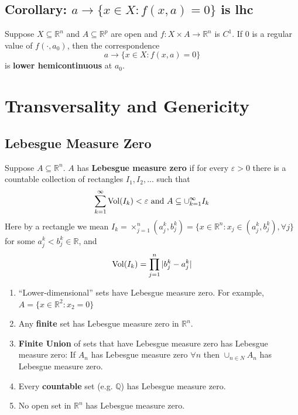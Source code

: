 \documentclass[11pt]{elegantbook}
\begin{document}
\subsection{Corollary: $a \rightarrow \{x\in X: f(x,a)=0\}$ is lhc}
\begin{corollary}
    Suppose $X \subseteq \mathbb{R}^n$ and $A \subseteq \mathbb{R}^p$ are open and $f : X \times A \rightarrow \mathbb{R}^n$ is $C^1$. If $0$ is a regular value of $f(\cdot, a_0)$, then the correspondence $$a \rightarrow \{x\in X: f(x,a)=0\}$$
    is \textbf{lower hemicontinuous} at $a_0$.
\end{corollary}


\section{Transversality and Genericity}
\subsection{Lebesgue Measure Zero}
\begin{definition}
    \normalfont
    Suppose $A \subseteq \mathbb{R}^n$. $A$ has \textbf{Lebesgue measure zero} if for every $\varepsilon > 0$ there is a countable collection of rectangles $I_1, I_2, . . .$ such that
    \begin{equation}
        \begin{aligned}
            \sum_{k=1}^\infty\textnormal{Vol}(I_k)<\varepsilon \textnormal{ and }A\subseteq \cup_{k=1}^\infty I_k
        \end{aligned}
        \nonumber
    \end{equation}
    Here by a rectangle we mean $I_k = \times^n_{j=1}(a^k_j , b^k_j)=\{x\in \mathbb{R}^n: x_j\in (a^k_j , b^k_j), \forall j\}$ for some $a^k_j < b^k_j \in \mathbb{R}$, and
    \begin{equation}
        \begin{aligned}
            \textnormal{Vol}(I_k)=\prod_{j=1}^n|b^k_j-a^k_j|
        \end{aligned}
        \nonumber
    \end{equation}
\end{definition}

\begin{example}
    \begin{enumerate}
        \item “Lower-dimensional” sets have Lebesgue measure zero. For example, $A=\{x\in\mathbb{R}^2:x_2=0\}$
        \item Any \textbf{finite} set has Lebesgue measure zero in $\mathbb{R}^n$.
        \item \textbf{Finite Union} of sets that have Lebesgue measure zero has Lebesgue measure zero: If $A_n$ has Lebesgue measure zero $\forall n$ then $\cup_{n\in N}A_n$ has Lebesgue measure zero.
        \item Every \textbf{countable} set (e.g. $\mathbb{Q}$) has Lebesgue measure zero.
        \item No open set in $\mathbb{R}^n$ has Lebesgue measure zero.
    \end{enumerate}
\end{example}
\end{document}

